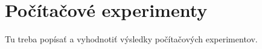 \chapter{Počítačové experimenty}

Tu treba popísať a vyhodnotiť výsledky počítačových experimentov.





